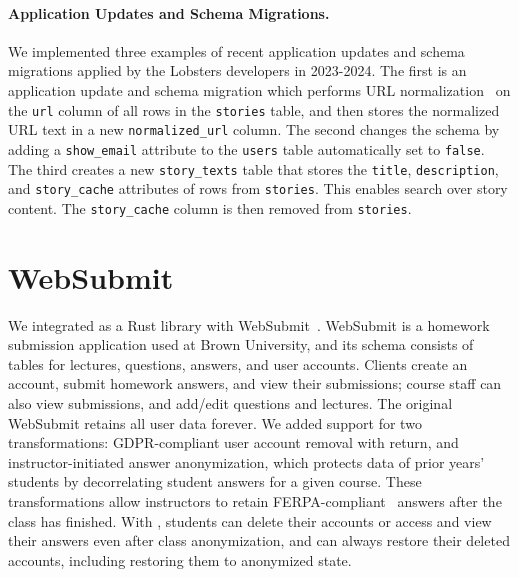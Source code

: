 \paragraph{Application Updates and Schema Migrations.}
\label{s:casestudies:updates}
We implemented three examples of recent application updates and schema
migrations applied by the Lobsters developers in 2023-2024. 
%
The first is an application update and schema migration which performs URL 
normalization~\cite{urinorm} on the \texttt{url} column of all rows in the
\texttt{stories} table, and then stores the normalized URL text in a new
\texttt{normalized\_url} column.
%
%
The second changes the schema by adding a \texttt{show\_email} attribute to the
\texttt{users} table automatically set to \texttt{false}. 
%
The third creates a new \texttt{story\_texts} table that stores the
\texttt{title}, \texttt{description}, and \texttt{story\_cache} attributes of
rows from \texttt{stories}. This enables search over story content. The
\texttt{story\_cache} column is then removed from \texttt{stories}.

\section{WebSubmit}
\label{s:case-websubmit}

%
We integrated \sys as a Rust library with WebSubmit~\cite{websubmit-rs}.
%
WebSubmit is a homework submission application used at Brown University, and
its schema consists of tables for lectures, questions, answers, and user accounts.
%
Clients create an account, submit homework answers, and view their submissions;
course staff can also view submissions, and add/edit questions and lectures.
%
The original WebSubmit retains all user data forever.
%
We added support for two \xxing
transformations: {GDPR-compliant user account removal} with return, and
{instructor-initiated answer anonymization}, which protects data of prior years'
students by decorrelating student answers for a given course.
%
These transformations allow instructors to retain FERPA-compliant~\cite{ferpa}
answers after the class has finished. %
%
With \sys, students can delete their
accounts or access and view their answers even after class anonymization,
and can always restore their deleted accounts, including restoring them to
anonymized state.
%
%


